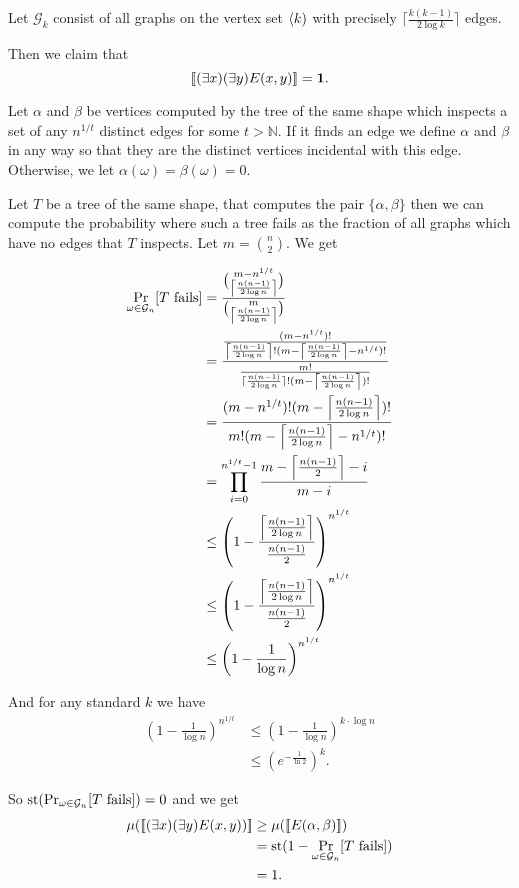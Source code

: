 \begin{exam}\label{examsparseedge}
Let $\mathcal{G}_k$ consist of all graphs on the vertex set $\langle k)$ with precisely $\lceil\frac{k(k-1)}{2\log k}\rceil$ edges.

Then we claim that
\[[\![(\exists x)(\exists y)E(x,y)]\!]=\textbf{1}.\]

Let $\alpha$ and $\beta$ be vertices computed by the tree of the same shape which inspects a set of any $n^{1/t}$ distinct edges for some $t>\mathbb{N}$. If it finds an edge we define $\alpha$ and $\beta$ in any way so that they are the distinct vertices incidental with this edge. Otherwise, we let $\alpha(\omega)=\beta(\omega)=0$.

Let $T$ be a tree of the same shape, that computes the pair $\{\alpha,\beta\}$ then we can compute the probability where such a tree fails as the fraction of all graphs which have no edges that $T$ inspects. Let $m=\binom{n}{2}$. We get

\begin{align}
\Pr_{\omega\in\mathcal{G}_n}[T\text{ fails}]&=\frac{\binom{m-n^{1/t}}{\left \lceil { \frac{n(n-1)}{2\log n}} \right \rceil }}{\binom{m}{\left \lceil { \frac{n(n-1)}{2\log n}} \right \rceil}}\\
&=\frac{\frac{(m-n^{1/t})!}{\left \lceil {\frac{n(n-1)}{2\log n}} \right \rceil ! (m-\left \lceil { \frac{n(n-1)}{2\log n}} \right \rceil-n^{1/t})!}}{\frac{m!}{\lceil \frac{n(n-1)}{2\log n}\rceil!(m-\left \lceil {\frac{n(n-1)}{2\log n}} \right \rceil)!}}\\
&=\frac{(m-n^{1/t})!(m-\left \lceil { \frac{n(n-1)}{2\log n}} \right \rceil)!}{m!(m-\left \lceil {\frac{n(n-1)}{2\log n}} \right \rceil-n^{1/t})!}\\
&=\prod_{i=0}^{n^{1/t}-1}\frac{m-\left \lceil {\frac{n(n-1)}{2}} \right \rceil-i}{m-i}\\
&\leq\left(1-\frac{\left \lceil {\frac{n(n-1)}{2\log n}} \right \rceil}{\frac{n(n-1)}{2}}\right)^{n^{1/t}}\\
&\leq\left(1-\frac{\left \lceil {\frac{n(n-1)}{2\log n}} \right \rceil}{\frac{n(n-1)}{2}}\right)^{n^{1/t}}\\
&\leq\left(1-\frac{1}{\log n}\right)^{n^{1/t}}
\end{align}

And for any standard $k$ we have
\begin{align}
\left(1-\frac{1}{\log n}\right)^{n^{1/t}}&\leq\left(1-\frac{1}{\log n}\right)^{k\cdot \log n}\\
&\leq (e^{-\frac{1}{\ln 2}})^k.
\end{align}

So $\text{st}(\Pr_{\omega\in\mathcal{G}_n}[T\text{ fails}])=0$ and we get 
\begin{align}
\mu([\![(\exists x)(\exists y)E(x,y)) ]\!] &\geq \mu([\![ E(\alpha,\beta)]\!])\\
&=\text{st}(1-\Pr_{\omega\in\mathcal{G}_n}[T\text{ fails}])\\
&=1.
\end{align}
\end{exam}

